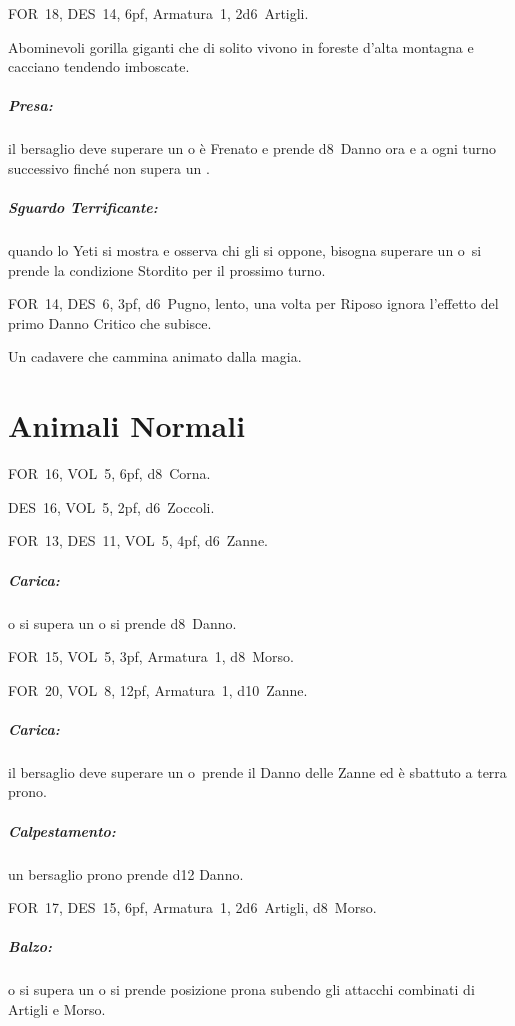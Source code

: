 \documentclass[itdr]{subfiles}
\begin{document}
\vfill

FOR~18, DES~14, 6pf, Armatura~1, 2d6~Artigli.

Abominevoli gorilla giganti che di solito vivono in foreste d'alta montagna e cacciano tendendo imboscate.

\subparagraph{Presa:} il bersaglio deve superare un  o è Frenato e prende d8~Danno ora e a ogni turno successivo finché non supera un .

\subparagraph{Sguardo Terrificante:} quando lo Yeti si mostra e osserva chi gli si oppone, bisogna superare un  o~si prende la condizione Stordito per il prossimo turno.

\vfill

FOR~14, DES~6, 3pf, d6~Pugno, lento, una volta per Riposo \mbox{ignora} l'effetto del primo Danno Critico che subisce.

Un cadavere che cammina animato dalla magia.

\vspace{15ex}
\break

\section{Animali Normali}

FOR~16, VOL~5, 6pf, d8~Corna.

\vspace{2ex}

DES~16, VOL~5, 2pf, d6~Zoccoli.

\vspace{2ex}

FOR~13, DES~11, VOL~5, 4pf, d6~Zanne.
\subparagraph{Carica:} o si supera un  o si prende d8~Danno.

\vspace{2ex}

FOR~15, VOL~5, 3pf, Armatura~1, d8~Morso.

\vspace{2ex}

FOR~20, VOL~8, 12pf, Armatura~1, d10~Zanne.
\subparagraph{Carica:} il bersaglio deve superare un  o~prende il Danno delle Zanne ed è sbattuto a terra prono.
\subparagraph{Calpestamento:} un bersaglio prono prende d12 Danno.

\vspace{2ex}

FOR~17, DES~15, 6pf, Armatura~1, 2d6~Artigli, d8~Morso.
\subparagraph{Balzo:} o si supera un  o si prende posizione prona subendo gli attacchi combinati di Artigli e Morso.
\end{document}

